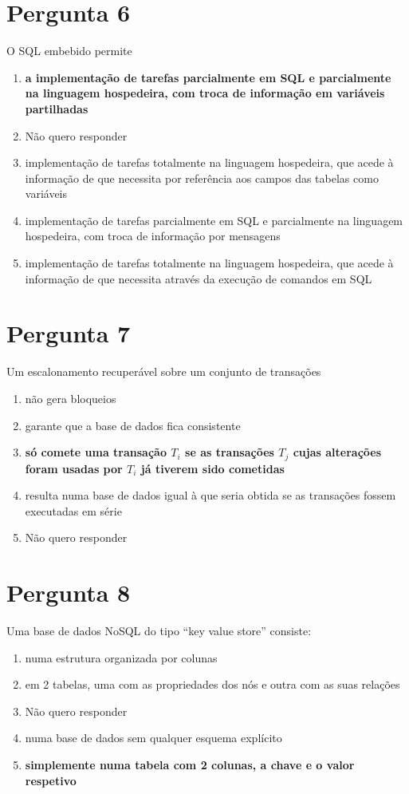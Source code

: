 \documentclass[type=recurso, year=2015/16]{bdad_exam}
\begin{document}
{\section{Pergunta 6}
O SQL embebido permite
\begin{enumerate}[label=\alph*.]\itemsep0em
    \item \textbf{a implementação de tarefas parcialmente em SQL e parcialmente na linguagem hospedeira, com troca de informação em variáveis partilhadas \greencheckmark}
    \item Não quero responder
    \item implementação de tarefas totalmente na linguagem hospedeira, que acede à informação de que necessita por referência aos campos das tabelas como variáveis
    \item implementação de tarefas parcialmente em SQL e parcialmente na linguagem hospedeira, com troca de informação por mensagens
    \item implementação de tarefas totalmente na linguagem hospedeira, que acede à informação de que necessita através da execução de comandos em SQL
\end{enumerate}

\section{Pergunta 7}
Um escalonamento recuperável sobre um conjunto de transações
\begin{enumerate}[label=\alph*.]\itemsep0em
    \item não gera bloqueios
    \item garante que a base de dados fica consistente
    \item \textbf{só comete uma transação $T_i$ se as transações $T_j$ cujas alterações foram usadas por $T_i$ já tiverem sido cometidas \greencheckmark}
    \item resulta numa base de dados igual à que seria obtida se as transações fossem executadas em série
    \item Não quero responder
\end{enumerate}

\section{Pergunta 8}
Uma base de dados NoSQL do tipo ``key value store'' consiste:
\begin{enumerate}[label=\alph*.]\itemsep0em
    \item numa estrutura organizada por colunas
    \item em 2 tabelas, uma com as propriedades dos nós e outra com as suas relações
    \item Não quero responder
    \item numa base de dados sem qualquer esquema explícito
    \item \textbf{simplemente numa tabela com 2 colunas, a chave e o valor respetivo \greencheckmark}
\end{enumerate}

}
\end{document}
